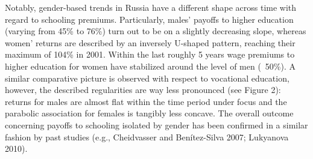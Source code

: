 \documentclass[12pt,a4paper]{article}
\begin{document}
Notably, gender-based trends in Russia have a different shape across time with regard to schooling premiums. Particularly, males' payoffs to higher education (varying from 45\% to 76\%) turn out to be on a slightly decreasing slope, whereas women' returns are described by an inversely U-shaped pattern, reaching their maximum of 104\% in 2001. Within the last roughly 5 years wage premiums to higher education for women have stabilized around the level of men (~50\%). A similar comparative picture is observed with respect to vocational education, however, the described regularities are way less pronounced (see Figure 2): returns for males are almost flat within the time period under focus and the parabolic association for females is tangibly less concave. The overall outcome concerning payoffs to schooling isolated by gender has been confirmed in a similar fashion by past studies (e.g., Cheidvasser and Benítez-Silva 2007; Lukyanova 2010).


\newpage
\end{document}
